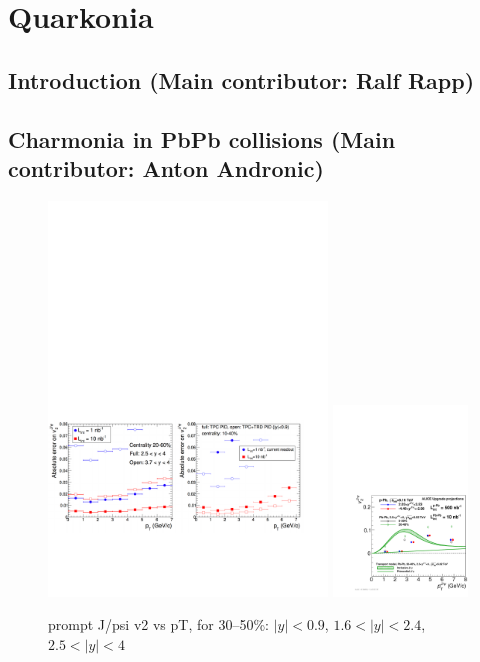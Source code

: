 \documentclass[../report.tex]{subfiles}
\begin{document}
\section{Quarkonia}

\subsection{Introduction (Main contributor: Ralf Rapp)}

\subsection{Charmonia in PbPb collisions (Main contributor: Anton Andronic)}


\begin{figure}

\begin{center}
 \includegraphics[width=0.66\textwidth]{fig/alice/alice_jpsi_v2_projected.pdf}
 \includegraphics[width=0.32\textwidth]{fig/alice/alice_jpsi_v2_projected2.pdf}
\end{center}

 \caption{prompt J/psi v2 vs pT, for 30--50\%: $|y|<0.9$, $1.6<|y|<2.4$, $2.5<|y|<4$~\cite{Abelev:1475243,CERN-LHCC-2013-014}}
\end{figure}
\end{document}
